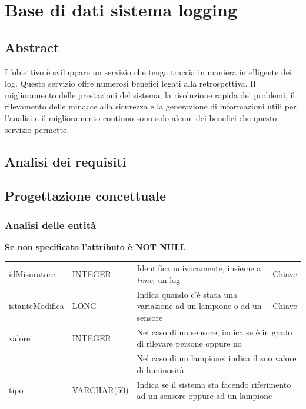 \section{Base di dati sistema logging}

\subsection{Abstract}

L’obiettivo è sviluppare un servizio che tenga traccia in maniera intelligente dei log. Questo servizio offre numerosi benefici legati alla retrospettiva. Il miglioramento delle prestazioni del sistema, la risoluzione rapida dei problemi, il rilevamento delle minacce alla sicurezza e la generazione di informazioni utili per l'analisi e il miglioramento continuo sono solo alcuni dei benefici che questo servizio permette.

\subsection{Analisi dei requisiti}

\subsection{Progettazione concettuale}

\subsubsection{Analisi delle entità}

\textbf{Se non specificato l'attributo è NOT NULL}

\begin{center}
    \begin{tabularx}{\textwidth}{|l|l|l|X|}
        \hline
        \rowcolor{gray!30}
        \multicolumn{4}{|c|}{\textbf{LOG}}\\
        \hline
        idMisuratore & INTEGER & Identifica univocamente, insieme a {\it{time}}, un log & Chiave\\
        \hline
        istanteModifica & LONG & Indica quando c'è stata una variazione ad un lampione o ad un sensore & Chiave\\
        \hline
        valore & INTEGER & \multicolumn{2}{l|}{Nel caso di un sensore, indica se è in grado di rilevare persone oppure no} \\
        & & \multicolumn{2}{l|}{Nel caso di un lampione, indica il suo valore di luminosità} \\
        \hline
        tipo & VARCHAR(50) & \multicolumn{2}{l|}{Indica se il sistema sta facendo riferimento ad un sensore oppure ad un lampione} \\
        \hline
    \end{tabularx}
\end{center}

